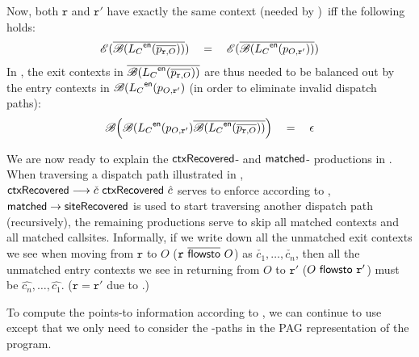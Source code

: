 Now, both $\mathtt{r}$ and $\mathtt{r}'$ have exactly the same context (needed by \dispatchconTwo)~iff the following holds:
\begin{eqnarray}
\label{eq:pt-ctxobj}
\begin{tabular}{c}
${\RawCtxHat{\overline{\BalParen{\LC^\entry(\overline{p_{\mathtt{r},O}})}}}} \quad = \quad
{\RawCtxHat{\overline{\BalParen{\LC^\entry(p_{O,\mathtt{r}'})}}}}$
\end{tabular}
\end{eqnarray}
In \LR,  the exit contexts in 
$\overline{{{\mbox{$\mathscr{B}(\mbox{${L}_C$}^\textsf{en}(\overline{p_{\mathtt{r},O}}))$}}}}$ are thus needed to be  balanced out by the
entry contexts in 
${{\mbox{$\mathscr{B}(\mbox{${L}_C$}^\textsf{en}(p_{O,\mathtt{r}'})$}}}$ (in order to eliminate invalid
dispatch paths):
\begin{equation}
\label{eq:lr-bal}
\begin{tabular}{c}
$\BalParenBig{
{{\BalParen{\LC^\entry(p_{O,\mathtt{r}'}}}}
\overline{{{\BalParen{\LC^\entry(\overline{p_{\mathtt{r},O}})}}}} 
 } \quad = \quad \epsilon$
\end{tabular}
\end{equation}


We are now ready to explain the $\textsf{ctxRecovered}$- and $\textsf{matched}$- productions in \LR. When
traversing a dispatch path illustrated in ,
$\textsf{ctxRecovered} \longrightarrow \check{{c}} ~ \textsf{ctxRecovered} ~ \hat{{c}}$ serves to enforce \dispatchconTwo according to
, $\textsf{matched} \rightarrow \textsf{siteRecovered}$ is used to start traversing another
dispatch path (recursively),  the remaining productions serve to skip all matched contexts and all matched callsites. Informally, if we write down all the unmatched exit contexts 
we see when moving from $\mathtt{r}$ to $O$ ($\mathtt{r} ~\overline{\textsf{flowsto}} ~ O$)
as $\check{c_1}, \dots, \check{c_n}$, then all the unmatched entry contexts we see
in returning from $O$ to $\mathtt{r}'$ ($O ~\textsf{flowsto} ~ \mathtt{r}'$) must be $\hat{c_n}, \dots, \hat{c_1}$.
($\mathtt{r}=\mathtt{r}'$ due to \dispatchconOne.)

To compute  the points-to information according to \LFCR, we can continue to use
     except
that we only need to consider the \LFCR-paths in the PAG representation of the program.

